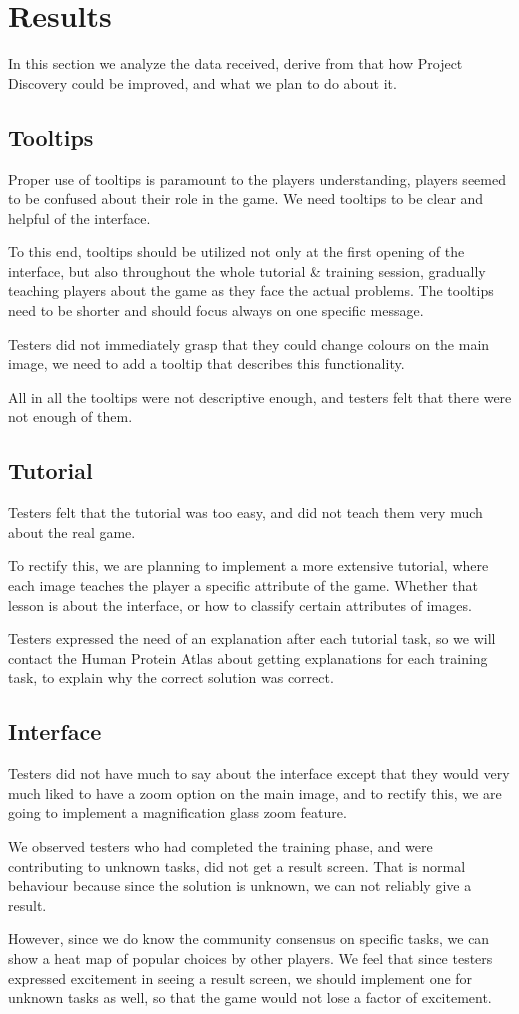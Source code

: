 \section{Results}\label{sec:results}
In this section we analyze the data received, derive from that how Project Discovery could be improved, and what we plan to do about it.

\subsection{Tooltips}
Proper use of tooltips is paramount to the players understanding, players seemed to be confused about their role in the game. We need tooltips to be clear and helpful of the interface.

To this end, tooltips should be utilized not only at the first opening of the interface, but also throughout the whole tutorial \& training session, gradually teaching players about the game as they face the actual problems.
The tooltips need to be shorter and should focus always on one specific message.

Testers did not immediately grasp that they could change colours on the main image, we need to add a tooltip that describes this functionality.

All in all the tooltips were not descriptive enough, and testers felt that there were not enough of them.

\subsection{Tutorial}
Testers felt that the tutorial was too easy, and did not teach them very much about the real game.

To rectify this, we are planning to implement a more extensive tutorial, where each image teaches the player a specific attribute of the game. Whether that lesson is about the interface, or how to classify certain attributes of images. 

Testers expressed the need of an explanation after each tutorial task, so we will contact the Human Protein Atlas about getting explanations for each training task, to explain why the correct solution was correct.

\subsection{Interface}
Testers did not have much to say about the interface except that they would very much liked to have a zoom option on the main image, and to rectify this, we are going to implement a magnification glass zoom feature.



We observed testers who had completed the training phase, and were contributing to unknown tasks, did not get a result screen. That is normal behaviour because since the solution is unknown, we can not reliably give a result. 

However, since we do know the community consensus on specific tasks, we can show a heat map of popular choices by other players. We feel that since testers expressed excitement in seeing a result screen, we should implement one for unknown tasks as well, so that the game would not lose a factor of excitement.